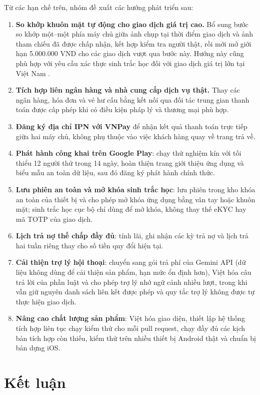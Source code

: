 Từ các hạn chế trên, nhóm đề xuất các hướng phát triển sau:
\begin{enumerate}
	\item \textbf{So khớp khuôn mặt tự động cho giao dịch giá trị cao.} Bổ sung bước so khớp một--một phía máy chủ giữa ảnh chụp tại thời điểm giao dịch và ảnh tham chiếu đã được chấp nhận, kết hợp kiểm tra người thật, rồi mới mở giới hạn 5.000.000 VND cho các giao dịch vượt qua bước này. Hướng này cũng phù hợp với yêu cầu xác thực sinh trắc học đối với giao dịch giá trị lớn tại Việt Nam \parencite{ch5-sbv2345}.
	\item \textbf{Tích hợp liên ngân hàng và nhà cung cấp dịch vụ thật.} Thay các ngân hàng, hóa đơn và vé hư cấu bằng kết nối qua đối tác trung gian thanh toán được cấp phép khi có điều kiện pháp lý và thương mại phù hợp.
	\item \textbf{Đăng ký địa chỉ IPN với VNPay} để nhận kết quả thanh toán trực tiếp giữa hai máy chủ, không phụ thuộc vào việc khách hàng quay về trang trả về.
	\item \textbf{Phát hành công khai trên Google Play}: chạy thử nghiệm kín với tối thiểu 12 người thử trong 14 ngày, hoàn thiện trang giới thiệu ứng dụng và biểu mẫu an toàn dữ liệu, sau đó đăng ký phát hành chính thức.
	\item \textbf{Lưu phiên an toàn và mở khóa sinh trắc học}: lưu phiên trong kho khóa an toàn của thiết bị và cho phép mở khóa ứng dụng bằng vân tay hoặc khuôn mặt; sinh trắc học cục bộ chỉ dùng để mở khóa, không thay thế eKYC hay mã TOTP của giao dịch.
	\item \textbf{Lịch trả nợ thế chấp đầy đủ}: tính lãi, ghi nhận các kỳ trả nợ và lịch trả hai tuần riêng thay cho số tiền quy đổi hiện tại.
	\item \textbf{Cải thiện trợ lý hội thoại}: chuyển sang gói trả phí của Gemini API (dữ liệu không dùng để cải thiện sản phẩm, hạn mức ổn định hơn), Việt hóa câu trả lời của phần luật và cho phép trợ lý nhớ ngữ cảnh nhiều lượt, trong khi vẫn giữ nguyên danh sách liên kết được phép và quy tắc trợ lý không được tự thực hiện giao dịch.
	\item \textbf{Nâng cao chất lượng sản phẩm}: Việt hóa giao diện, thiết lập hệ thống tích hợp liên tục chạy kiểm thử cho mỗi pull request, chạy đầy đủ các kịch bản tích hợp còn thiếu, kiểm thử trên nhiều thiết bị Android thật và chuẩn bị bản dựng iOS.
\end{enumerate}

\section{Kết luận}
\label{sec:ch5-ket-luan}

